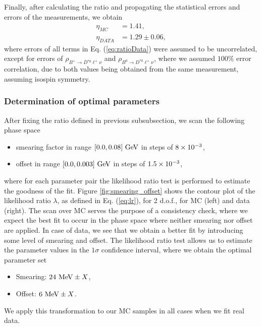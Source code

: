 Finally, after calculating the ratio and propagating the statistical errors and errors of the measurements, we obtain
\begin{align*}
\eta_{MC} &= 1.41,\\
\eta_{DATA} &= 1.29\pm 0.06,
\end{align*}
where errors of all terms in Eq. (\ref{eq:ratioData}) were assumed to be uncorrelated, except for errors of $\rho_{B^+ \to \bar D {}^{*0} \ell^+ \nu}$ and $\rho_{B^0 \to D^{*0} \ell^+ \nu}$, where we assumed $100\%$ error correlation, due to both values being obtained from the same measurement, assuming isospin symmetry.

\subsubsection{Determination of optimal parameters}

After fixing the ratio defined in previous subsubsection, we scan the following phase space
\begin{itemize}
\item smearing factor in range $[0.0,0.08]\mathrm{~GeV}$ in steps of $8\times 10^{-3}$,
\item offset in range $[0.0,0.003]\mathrm{~GeV}$ in steps of $1.5\times 10^{-3}$,
\end{itemize}
where for each parameter pair the likelihood ratio test is performed to estimate the goodness of the fit. Figure \ref{fig:smearing_offset} shows the contour plot of the likelihood ratio $\lambda$, as defined in Eq. (\ref{eq:lr}), for 2 d.o.f., for MC (left) and data (right). The scan over MC serves the purpose of a consistency check, where we expect the best fit to occur in the phase space where neither smearing nor offset are applied. In case of data, we see that we obtain a better fit by introducing some level of smearing and offset. The likelihood ratio test allows us to estimate the parameter values in the $1\sigma$ confidence interval, where we obtain the optimal parameter set
\begin{itemize}
\item Smearing: $24\mathrm{~MeV} \pm X$,
\item Offset: $6\mathrm{~MeV} \pm X$.
\end{itemize}
We apply this transformation to our MC samples in all cases when we fit real data.

